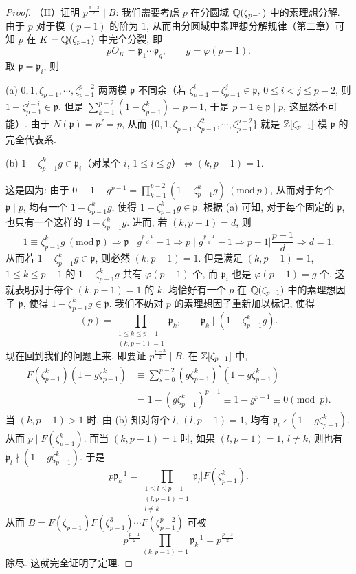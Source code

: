 \begin{proof}
（II）证明 $p^{\frac{p-3}{2}}\mid B$: 我们需要考虑 $p$ 在分圆域 $\mathbb{Q}(\zeta_{p-1})$ 中的素理想分解. 由于 $p$ 对于模 $(p-1)$ 的阶为 $1$, 从而由分圆域中素理想分解规律（第二章）可知 $p$ 在 $K=\mathbb{Q}(\zeta_{p-1})$ 中完全分裂, 即
\[
  pO_K=\mathfrak{p}_1\cdots\mathfrak{p}_g,\qquad g=\varphi(p-1).
\]
取 $\mathfrak{p}=\mathfrak{p}_i$, 则

(a) $0,1,\zeta_{p-1},\cdots,\zeta_{p-1}^{p-2}$ 两两模 $\mathfrak{p}$ 不同余（若 $\zeta_{p-1}^i-\zeta_{p-1}^j\in\mathfrak{p}$, $0\leqslant i<j\leqslant p-2$, 则 $1-\zeta_{p-1}^{j-i}\in\mathfrak{p}$. 但是 $\sum_{k=1}^{p-2}(1-\zeta_{p-1}^k)=p-1$, 于是 $p-1\in\mathfrak{p}\mid p$, 这显然不可能）. 由于 $N(\mathfrak{p})=p^f=p$, 从而 $\{0,1,\zeta_{p-1},\zeta_{p-1}^2,\cdots,\zeta_{p-1}^{p-2}\}$ 就是 $\mathbb{Z}[\zeta_{p-1}]$ 模 $\mathfrak{p}$ 的完全代表系.

(b) $1-\zeta_{p-1}^kg\in\mathfrak{p}_i$（对某个 $i$, $1\leqslant i\leqslant g$）$\Leftrightarrow(k,p-1)=1$.

这是因为: 由于 $0\equiv 1-g^{p-1}=\prod_{k=1}^{p-2}(1-\zeta_{p-1}^kg)\ (\mathrm{mod}\ p)$, 从而对于每个 $\mathfrak{p}\mid p$, 均有一个 $1-\zeta_{p-1}^kg$, 使得 $1-\zeta_{p-1}^kg\in\mathfrak{p}$. 根据 (a) 可知, 对于每个固定的 $\mathfrak{p}$, 也只有一个这样的 $1-\zeta_{p-1}^kg$. 进而, 若 $(k,p-1)=d$, 则
\[
  1\equiv\zeta_{p-1}^kg\ (\mathrm{mod}\ \mathfrak{p})\Rightarrow\mathfrak{p}\mid g^{\frac{p-1}{d}}-1\Rightarrow p\mid g^{\frac{p-1}{d}}-1
  \Rightarrow p-1\Big|\frac{p-1}{d}\Rightarrow d=1.
\]
从而若 $1-\zeta_{p-1}^kg\in\mathfrak{p}$, 则必然 $(k,p-1)=1$. 但是满足 $(k,p-1)=1$, $1\leqslant k\leqslant p-1$ 的 $1-\zeta_{p-1}^kg$ 共有 $\varphi(p-1)$ 个, 而 $\mathfrak{p}_i$ 也是 $\varphi(p-1)=g$ 个. 这就表明对于每个 $(k,p-1)=1$ 的 $k$, 均恰好有一个 $p$ 在 $\mathbb{Q}(\zeta_{p-1})$ 中的素理想因子 $\mathfrak{p}$, 使得 $1-\zeta_{p-1}^kg\in\mathfrak{p}$. 我们不妨对 $p$ 的素理想因子重新加以标记, 使得
\[
  (p)=\prod_{\substack{1\leqslant k\leqslant p-1\\ (k,p-1)=1}}\mathfrak{p}_k,\qquad\mathfrak{p}_k\mid(1-\zeta_{p-1}^kg).
\]
现在回到我们的问题上来, 即要证 $p^{\frac{p-3}{2}}\mid B$. 在 $\mathbb{Z}[\zeta_{p-1}]$ 中,
\begin{align*}
  F(\zeta_{p-1}^k)(1-g\zeta_{p-1}^k)&\equiv\sum_{s=0}^{p-2}(g\zeta_{p-1}^k)^s(1-g\zeta_{p-1}^k)\\
  &=1-(g\zeta_{p-1}^k)^{p-1}\equiv 1-g^{p-1}\equiv 0\pmod{p}.
\end{align*}
当 $(k,p-1)>1$ 时, 由 (b) 知对每个 $l$, $(l,p-1)=1$, 均有 $\mathfrak{p}_l\nmid(1-g\zeta_{p-1}^k)$. 从而 $p\mid F(\zeta_{p-1}^k)$. 而当 $(k,p-1)=1$ 时, 如果 $(l,p-1)=1$, $l\neq k$, 则也有 $\mathfrak{p}_l\nmid(1-g\zeta_{p-1}^k)$. 于是
\[
  p\mathfrak{p}_k^{-1}=\prod_{\substack{1\leqslant l\leqslant p-1\\ (l,p-1)=1\\ l\neq k}}\mathfrak{p}_l\Big|F(\zeta_{p-1}^k).
\]
从而 $B=F(\zeta_{p-1})F(\zeta_{p-1}^3)\cdots F(\zeta_{p-1}^{p-2})$ 可被
\[
  p^{\frac{p-1}{2}}\prod_{(k,p-1)=1}\mathfrak{p}_k^{-1}=p^{\frac{p-3}{2}}
\]
除尽. 这就完全证明了定理.
\end{proof}

